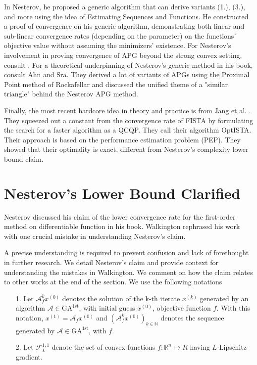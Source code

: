 \documentclass[]{article}
\theoremstyle{definition}
\numberwithin{equation}{subsection}
\begin{document}
        In Nesterov\cite{nesterov_lecture_2018}, he proposed a generic algorithm that can derive variants (1.), (3.), and more using the idea of Estimating Sequences and Functions. 
        He constructed a proof of convergence on his generic algorithm, demonstrating both linear and sub-linear convergence rates (depending on the parameter) on the functions' objective value without assuming the minimizers' existence. 
        For Nesterov's involvement in proving convergence of APG beyond the strong convex setting, consult \cite{necoara_linear_2019}. 
        For a theoretical underpinning of Nesterov's generic method in his book, consult Ahn and Sra\cite{ahn_understanding_2022}. 
        They derived a lot of variants of APGs using the Proximal Point method of Rockafellar and discussed the unified theme of a "similar triangle" behind the Nesterov APG method. 
        \par
        Finally, the most recent hardcore idea in theory and practice is from Jang et al. \cite{jang_computer-assisted_2023}. 
        They squeezed out a constant from the convergence rate of FISTA by formulating the search for a faster algorithm as a QCQP. 
        They call their algorithm OptISTA. 
        Their approach is based on the performance estimation problem (PEP). 
        They showed that their optimality is exact, different from Nesterov's complexity lower bound claim. 


\section{Nesterov's Lower Bound Clarified}\label{sec:optimal_lower_bound}
    Nesterov discussed his claim of the lower convergence rate for the first-order method on differentiable function in his book\cite{nesterov_lectures_2018}. 
    Walkington\cite{noel_nesterovs_nodate} rephrased his work with one crucial mistake in understanding Nesterov's claim. 
    \par
    A precise understanding is required to prevent confusion and lack of forethought in further research.
    We detail Nesterov's claim and provide context for understanding the mistakes in Walkington. 
    We comment on how the claim relates to other works at the end of the section. 
    \newcommand*{\GAfirst}{\text{GA}^{\text{1st}}} %
    We use the following notations
    \begin{itemize}
        \item [1.] Let $\mathcal A^k_fx^{(0)}$ denotes the solution of the k-th iterate $x^{(k)}$ generated by an algorithm $\mathcal A \in \GAfirst$, with initial guess $x^{(0)}$, objective function $f$. 
        With this notation, $x^{(1)} = \mathcal A_f x^{(0)}$ and $(\mathcal A_f^{k}x^{(0)})_{k \in \mathbb N}$ denotes the sequence generated by $\mathcal A \in \GAfirst$, with $f$.
        \item [2.] Let $\mathcal F^{1, 1}_L$ denote the set of convex functions $f: \mathbb R^n \mapsto R$ having $L$-Lipschitz gradient. 
    \end{itemize}
\end{document}
